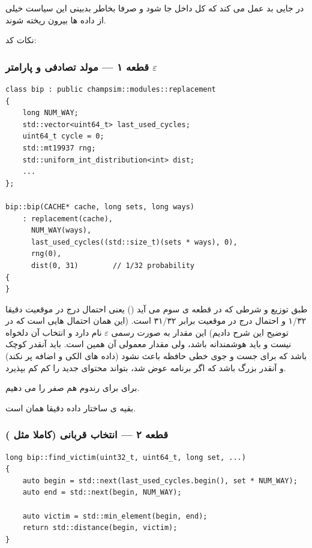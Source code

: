 \documentclass[12pt,a4paper]{article}
\begin{document}
در جایی بد عمل می کند که کل  داخل  جا شود و صرفا بخاطر بدبینی این سیاست خیلی از داده ها بیرون ریخته شوند.

نکات کد:

\subsubsection{قطعه ۱ — مولد تصادفی و پارامتر $\varepsilon$}

\begin{latin}
\begin{lstlisting}
class bip : public champsim::modules::replacement
{
    long NUM_WAY;
    std::vector<uint64_t> last_used_cycles;
    uint64_t cycle = 0;
    std::mt19937 rng;
    std::uniform_int_distribution<int> dist;
    ...
};

bip::bip(CACHE* cache, long sets, long ways)
    : replacement(cache),
      NUM_WAY(ways),
      last_used_cycles((std::size_t)(sets * ways), 0),
      rng(0),
      dist(0, 31)        // 1/32 probability
{
}
\end{lstlisting}
\end{latin}

طبق توزیع  و شرطی که در قطعه ی سوم می آید () یعنی احتمال درج در موقعیت  دقیقا ۱/۳۲ و احتمال درج در موقعیت  برابر ۳۱/۳۲ است. (این همان احتمال هایی است که در توضیح این  شرح دادیم) این مقدار به صورت رسمی $\varepsilon$ نام دارد و انتخاب آن دلخواه نیست و باید هوشمندانه باشد، ولی مقدار معمولی آن همین است. باید آنقدر کوچک باشد که برای جست و جوی خطی حافظه باعث  نشود (داده های الکی و اضافه پر نکند) و آنقدر بزرگ باشد که اگر  برنامه عوض شد،  بتواند محتوای جدید را کم کم بپذیرد.

برای  برای رندوم هم  صفر را می دهیم.

بقیه ی ساختار داده دقیقا همان  است.

\subsubsection{قطعه ۲ — انتخاب قربانی (کاملا مثل )}

\begin{latin}
\begin{lstlisting}
long bip::find_victim(uint32_t, uint64_t, long set, ...)
{
    auto begin = std::next(last_used_cycles.begin(), set * NUM_WAY);
    auto end = std::next(begin, NUM_WAY);

    auto victim = std::min_element(begin, end);
    return std::distance(begin, victim);
}
\end{lstlisting}
\end{latin}
\end{document}

